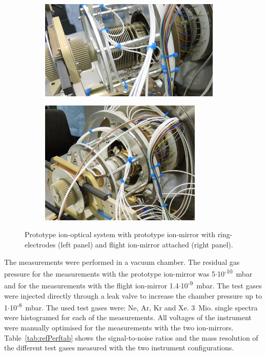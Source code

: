 	\begin{figure}[H]
		\begin{subfigure}{0.5\textwidth}
			\centering
			\includegraphics[width = 0.95\textwidth]{Experiments/reflectron_Prototype1.jpg}
		\end{subfigure}
		\begin{subfigure}{0.5\textwidth}
			\centering
			\includegraphics[width = 0.85\textwidth]{Experiments/reflectron_flight.JPG}
		\end{subfigure}
		\caption{Prototype ion-optical system with prototype ion-mirror with ring-electrodes (left panel) and flight ion-mirror attached (right panel).}
		\label{fig:ExpRefl}
	\end{figure}
	The measurements were performed in a vacuum chamber. The residual gas pressure for the measurements with the prototype ion-mirror was 5$\cdot$10\textsuperscript{-10}~mbar and for the measurements with the flight ion-mirror 1.4$\cdot$10\textsuperscript{-9}~mbar. The test gases were injected directly through a leak valve to increase the chamber pressure up to 1$\cdot$10\textsuperscript{-8}~mbar. The used test gases were: Ne, Ar, Kr and Xe. 3~Mio. single spectra were histogramed for each of the measurements. All voltages of the instrument were manually optimised for the measurements with the two ion-mirrors. Table~\ref{tab:refPerftab} shows the signal-to-noise ratios and the mass resolution of the different test gases measured with the two instrument configurations.\\
